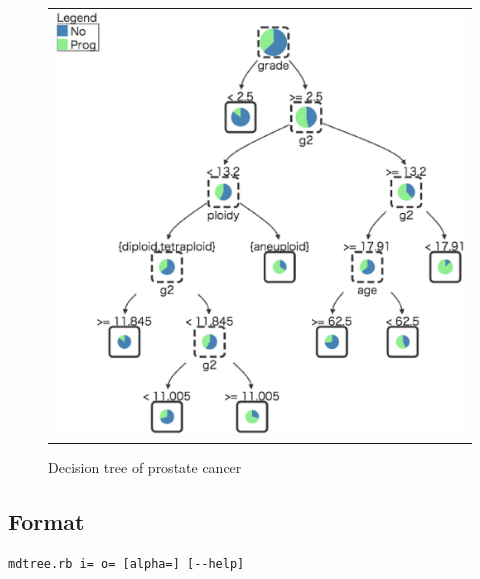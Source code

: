 \begin{figure}[htbp]
\begin{center}
\begin{tabular}{c}

\begin{minipage}{0.5\hsize}
\begin{center}
\includegraphics[scale=0.5]{figure/tree_4.eps}
\caption{Decision tree of prostate cancer\label{fig:mdtree_tree_4}}
\end{center}
\end{minipage}

\end{tabular}
\end{center}
\end{figure}



\subsection{Format}
\begin{verbatim}
mdtree.rb i= o= [alpha=] [--help]
\end{verbatim}

